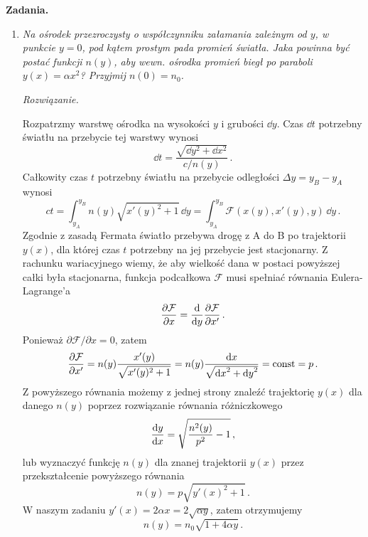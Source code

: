 \documentclass[../main.tex]{subfiles}
\begin{document}
\textbf{Zadania.}
\begin{enumerate}
    \item \textit{Na ośrodek przezroczysty o współczynniku załamania zależnym od \(y\), w punkcie \(y=0\), pod kątem prostym pada promień światła. Jaka powinna być postać funkcji \(n(y)\), aby wewn. ośrodka promień biegł po paraboli \(y(x)=\alpha x^2\)? Przyjmij \(n(0)=n_0\).}
\medskip

\textit{Rozwiązanie.}
\medskip

Rozpatrzmy warstwę ośrodka na wysokości \(y\) i grubości \(\dd y\). Czas \(\dd t\) potrzebny światłu na przebycie tej warstwy wynosi
\begin{equation*}
    \dd{t}=\frac{\sqrt{\dd{y}^2+\dd{x}^2}}{c/n(y)}\,.
\end{equation*}
Całkowity czas \(t\) potrzebny światłu na przebycie odległości \(\Delta y=y_B-y_A\) wynosi
\begin{equation*}
    ct=\int_{y_A}^{y_B} n(y)\sqrt{x'(y)^2+1}\,\dd{y}=\int_{y_A}^{y_B} \mathcal{F}(x(y), x'(y), y)\,\dd{y}\,.
\end{equation*}
Zgodnie z zasadą Fermata światło przebywa drogę z A do B po trajektorii \(y(x)\), dla której czas \(t\) potrzebny na jej przebycie jest stacjonarny. Z rachunku wariacyjnego wiemy, że aby wielkość dana w postaci powyższej całki była stacjonarna, funkcja podcałkowa \(\mathcal{F}\) musi spełniać równania Eulera-Lagrange'a
\begin{equation*}
    \pdv{\mathcal{F}}{x}=\dv{}{y}\pdv{\mathcal{F}}{x'}\,.
\end{equation*}
Ponieważ \(\partial\mathcal{F}/\partial x=0\), zatem
\begin{equation*}
\pdv{\mathcal{F}}{x'}=n(y)\frac{x'(y)}{\sqrt{x'(y)^2+1}}=n(y)\frac{\dd{x}}{\sqrt{\dd{x}^2+\dd{y}^2}}=\text{const}=p\,.
\end{equation*}
 Z powyższego równania możemy z jednej strony znaleźć trajektorię \(y(x)\) dla danego \(n(y)\) poprzez rozwiązanie równania różniczkowego
\begin{equation*}
    \dv{y}{x}=\sqrt{\frac{n^2(y)}{p^2}-1}\,,
\end{equation*}
lub wyznaczyć funkcję \(n(y)\) dla znanej trajektorii \(y(x)\) przez przekształcenie powyższego równania
\begin{equation*}
    n(y)=p\sqrt{y'(x)^2+1}\,.
\end{equation*}
W naszym zadaniu \(y'(x)=2\alpha x=2\sqrt{\alpha y}\), zatem otrzymujemy
\begin{equation*}
    n(y)=n_0\sqrt{1+4\alpha y}\,.
\end{equation*}

\end{enumerate}
\end{document}

